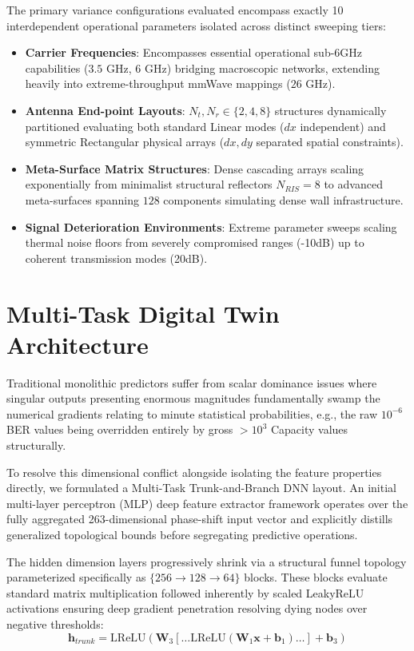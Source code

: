 \documentclass[conference]{IEEEtran}
\begin{document}
The primary variance configurations evaluated encompass exactly 10 interdependent operational parameters isolated across distinct sweeping tiers:
\begin{itemize}
    \item \textbf{Carrier Frequencies}: Encompasses essential operational sub-6GHz capabilities ($3.5$ GHz, $6$ GHz) bridging macroscopic networks, extending heavily into extreme-throughput mmWave mappings ($26$ GHz).
    \item \textbf{Antenna End-point Layouts}: $N_t, N_r \in \{2, 4, 8\}$ structures dynamically partitioned evaluating both standard Linear modes ($dx$ independent) and symmetric Rectangular physical arrays ($dx, dy$ separated spatial constraints).
    \item \textbf{Meta-Surface Matrix Structures}: Dense cascading arrays scaling exponentially from minimalist structural reflectors $N_{RIS}=8$ to advanced meta-surfaces spanning $128$ components simulating dense wall infrastructure.
    \item \textbf{Signal Deterioration Environments}: Extreme parameter sweeps scaling thermal noise floors from severely compromised ranges (-10dB) up to coherent transmission modes (20dB). 
\end{itemize}

\section{Multi-Task Digital Twin Architecture}

Traditional monolithic predictors suffer from scalar dominance issues where singular outputs presenting enormous magnitudes fundamentally swamp the numerical gradients relating to minute statistical probabilities, e.g., the raw $10^{-6}$ BER values being overridden entirely by gross $>10^3$ Capacity values structurally. 

To resolve this dimensional conflict alongside isolating the feature properties directly, we formulated a Multi-Task Trunk-and-Branch DNN layout. An initial multi-layer perceptron (MLP) deep feature extractor framework operates over the fully aggregated 263-dimensional phase-shift input vector and explicitly distills generalized topological bounds before segregating predictive operations.

The hidden dimension layers progressively shrink via a structural funnel topology parameterized specifically as $\{256 \rightarrow 128 \rightarrow 64\}$ blocks. These blocks evaluate standard matrix multiplication followed inherently by scaled LeakyReLU activations ensuring deep gradient penetration resolving dying nodes over negative thresholds:
\begin{equation}
\mathbf{h}_{trunk} = \text{LReLU}\left( \mathbf{W}_3 \left[ \dots \text{LReLU}(\mathbf{W}_1 \mathbf{x} + \mathbf{b}_1) \dots \right] + \mathbf{b}_3 \right)
\end{equation}
\end{document}
